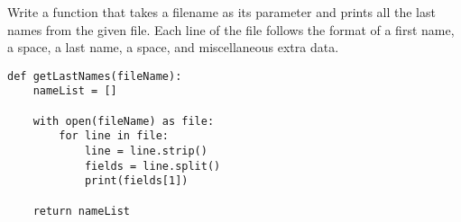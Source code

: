 Write a function that takes a filename as its parameter and prints all the last names from the given file. Each line of the file follows the format of a first name, a space, a last name, a space, and miscellaneous extra data. 

\begin{answer}
\begin{lstlisting}
def getLastNames(fileName):
    nameList = []

    with open(fileName) as file:
        for line in file:
            line = line.strip()
            fields = line.split()
            print(fields[1])

    return nameList
\end{lstlisting}
\end{answer}
